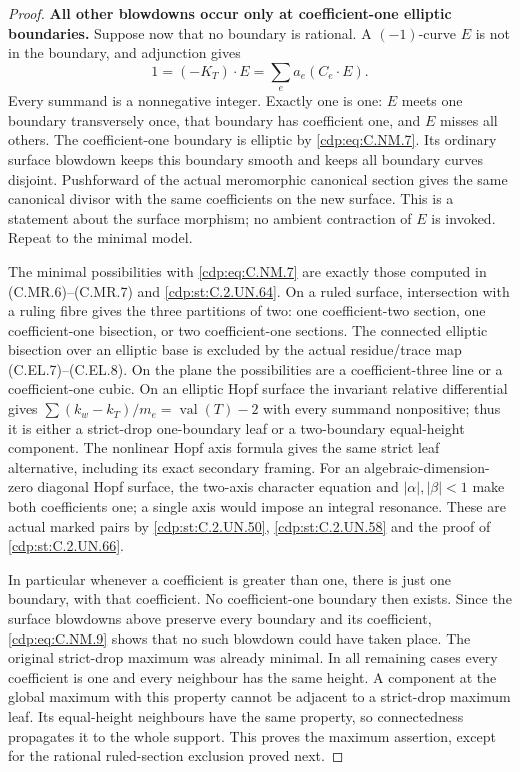 \begin{proof}
\par\medskip\noindent\textbf{All other blowdowns occur only at coefficient-one elliptic boundaries.}
Suppose now that no boundary is rational. A $(-1)$-curve
$E$ is not in the boundary, and adjunction gives
\[
                     1=(-K_T)\cdot E
                              =\sum_e a_e(C_e\cdot E).
\tag{C.NM.9}\label{cdp:eq:C.NM.9}
\]
Every summand is a nonnegative integer. Exactly one is
one: $E$ meets one boundary transversely once, that
boundary has coefficient one, and $E$ misses all others.
The coefficient-one boundary is elliptic by \eqref{cdp:eq:C.NM.7}.
Its ordinary surface blowdown keeps this boundary smooth
and keeps all boundary curves disjoint. Pushforward of
the actual meromorphic canonical section gives the same
canonical divisor with the same coefficients on the
new surface. This is a statement about the surface
morphism; no ambient contraction of $E$ is invoked.
Repeat to the minimal model.

The minimal possibilities with \eqref{cdp:eq:C.NM.7} are exactly those
computed in (C.MR.6)--(C.MR.7) and \ref{cdp:st:C.2.UN.64}. On a ruled
surface, intersection with a ruling fibre gives the three
partitions of two: one coefficient-two section, one
coefficient-one bisection, or two coefficient-one sections.
The connected elliptic bisection over an elliptic base is
excluded by the actual residue/trace map (C.EL.7)--(C.EL.8).
On the plane the possibilities are a coefficient-three
line or a coefficient-one cubic. On an elliptic Hopf
surface the invariant relative differential gives
$\sum (k_w-k_T)/m_e=\operatorname{val}(T)-2$ with every
summand nonpositive; thus it is either a strict-drop
one-boundary leaf or a two-boundary equal-height component.
The nonlinear Hopf axis formula gives the same strict
leaf alternative, including its exact secondary framing.
For an algebraic-dimension-zero diagonal Hopf surface,
the two-axis character equation and $|\alpha|,|\beta|<1$
make both coefficients one; a single axis would impose
an integral resonance. These are actual marked pairs
by \ref{cdp:st:C.2.UN.50}, \ref{cdp:st:C.2.UN.58} and the proof of \ref{cdp:st:C.2.UN.66}.

In particular whenever a coefficient is greater than
one, there is just one boundary, with that coefficient.
No coefficient-one boundary then exists. Since the
surface blowdowns above preserve every boundary and
its coefficient, \eqref{cdp:eq:C.NM.9} shows that no such blowdown
could have taken place. The original strict-drop maximum
was already minimal. In all remaining cases every
coefficient is one and every neighbour has the same
height. A component at the global maximum with this
property cannot be adjacent to a strict-drop maximum
leaf. Its equal-height neighbours have the same property,
so connectedness propagates it to the whole support.
This proves the maximum assertion, except for the
rational ruled-section exclusion proved next.


\end{proof}
